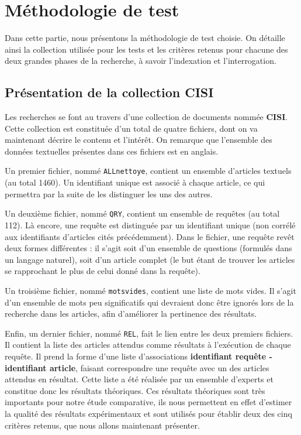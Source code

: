 \section{Méthodologie de test}

Dans cette partie, nous présentons la méthodologie de test choisie. On détaille ainsi la collection utilisée pour les tests et les critères retenus pour chacune des deux grandes phases de la recherche, à savoir l’indexation et l’interrogation.

\subsection{Présentation de la collection CISI}
\label{section:presentationCISI}
Les recherches se font au travers d'une collection de documents nommée \textbf{CISI}. Cette collection est constituée d’un total de quatre fichiers, dont on va maintenant décrire le contenu et l’intérêt. On remarque que l’ensemble des données textuelles présentes dans ces fichiers est en anglais.

Un premier fichier, nommé \texttt{ALLnettoye}, contient un ensemble d'articles textuels (au total 1460). Un identifiant unique est associé à chaque article, ce qui permettra par la suite de les distinguer les uns des autres.

Un deuxième fichier, nommé \texttt{QRY}, contient un ensemble de requêtes (au total 112). Là encore, une requête est distinguée par un identifiant unique (non corrélé aux identifiants d’articles cités précédemment). Dans le fichier, une requête revêt deux formes différentes : il s’agit soit d’un ensemble de questions (formulés dans un langage naturel), soit d’un article complet (le but étant de trouver les articles se rapprochant le plus de celui donné dans la requête). 

Un troisième fichier, nommé \texttt{motsvides}, contient une liste de mots vides. Il s’agit d’un ensemble de mots peu significatifs qui devraient donc être ignorés lors de la recherche dans les articles, afin d’améliorer la pertinence des résultats.

Enfin, un dernier fichier, nommé \texttt{REL}, fait le lien entre les deux premiers fichiers. Il contient la liste des articles attendus comme résultats à l'exécution de chaque requête. Il prend la forme d'une liste d'associations \textbf{identifiant requête - identifiant article}, faisant correspondre une requête avec un des articles attendus en résultat. Cette liste a été réalisée par un ensemble d'experts et constitue donc les résultats théoriques. Ces résultats théoriques sont très importants pour notre étude comparative, ils nous permettent en effet d’estimer la qualité des résultats expérimentaux et sont utilisés pour établir deux des cinq critères retenus, que nous allons maintenant présenter.

